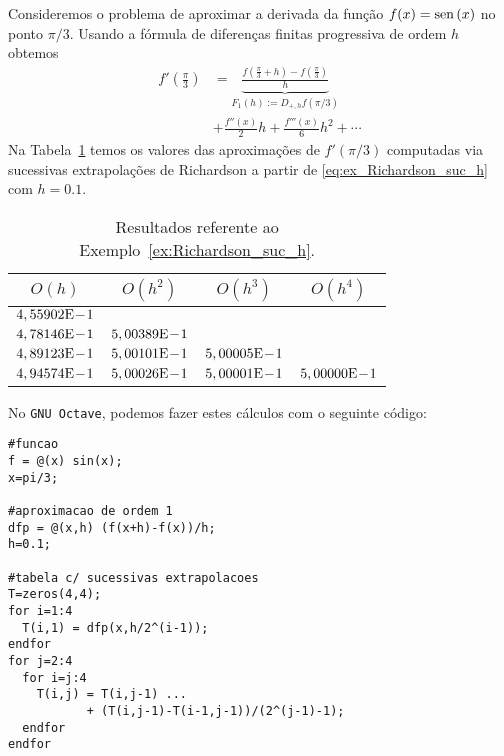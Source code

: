 \begin{ex}\label{ex:Richardson_suc_h}
  Consideremos o problema de aproximar a derivada da função $f(x) = \operatorname{sen}\,(x)$ no ponto $\pi/3$. Usando a fórmula de diferenças finitas progressiva de ordem $h$ obtemos
  \begin{align}
    f'\left(\frac{\pi}{3}\right) &= \underbrace{\frac{f\left(\frac{\pi}{3}+h\right)-f\left(\frac{\pi}{3}\right)}{h}}_{F_1(h) := D_{+,h}f(\pi/3)} \nonumber\\
          &+ \frac{f''(x)}{2}h + \frac{f'''(x)}{6}h^2 + \cdots \label{eq:ex_Richardson_suc_h}
  \end{align}
Na Tabela~\ref{tab:ex_Richardson_suc_h} temos os valores das aproximações de $f'(\pi/3)$ computadas via sucessivas extrapolações de Richardson a partir de \eqref{eq:ex_Richardson_suc_h} com $h=0.1$.

\begin{table}[h!]
  \centering
  \caption{Resultados referente ao Exemplo~\ref{ex:Richardson_suc_h}.}
  \begin{tabular}{cccc}\hline
    $O(h)$ & $O(h^2)$ & $O(h^3)$ & $O(h^4)$\\ \hline
    $4,55902\mathrm{E}\!-\!1$ \\
    $4,78146\mathrm{E}\!-\!1$ & $5,00389\mathrm{E}\!-\!1$ \\
    $4,89123\mathrm{E}\!-\!1$ & $5,00101\mathrm{E}\!-\!1$ & $5,00005\mathrm{E}\!-\!1$ \\
    $4,94574\mathrm{E}\!-\!1$ & $5,00026\mathrm{E}\!-\!1$ & $5,00001\mathrm{E}\!-\!1$ & $5,00000\mathrm{E}\!-\!1$ \\\hline
  \end{tabular}
  \label{tab:ex_Richardson_suc_h}
\end{table}

No \verb+GNU Octave+, podemos fazer estes cálculos com o seguinte código:
\begin{verbatim}
#funcao
f = @(x) sin(x);
x=pi/3;

#aproximacao de ordem 1
dfp = @(x,h) (f(x+h)-f(x))/h;
h=0.1;

#tabela c/ sucessivas extrapolacoes
T=zeros(4,4);
for i=1:4
  T(i,1) = dfp(x,h/2^(i-1));
endfor
for j=2:4
  for i=j:4
    T(i,j) = T(i,j-1) ... 
           + (T(i,j-1)-T(i-1,j-1))/(2^(j-1)-1);
  endfor
endfor
\end{verbatim}
\end{ex}

